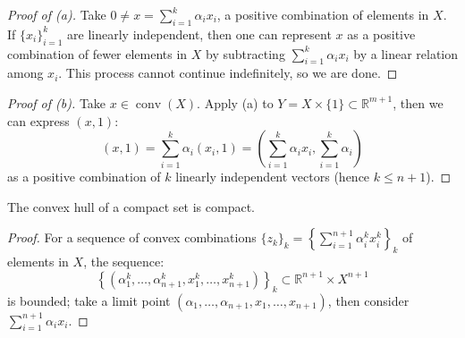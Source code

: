 \begin{proof}[Proof of (a)]
	Take $0\neq x=\sum_{i=1}^k\alpha_ix_i$, a positive combination of elements in $X$. If $\{x_i\}_{i=1}^k$ are linearly independent, then one can represent $x$ as a positive combination of fewer elements in $X$ by subtracting $\sum_{i=1}^k \alpha_ix_i$ by a linear relation among $x_i$. This process cannot continue indefinitely, so we are done.
\end{proof}

\begin{proof}[Proof of (b)]
	Take $x\in \operatorname{conv}(X)$. Apply (a) to $Y=X\times\{1\}\subset \mathbb{R}^{m+1}$, then we can express $(x,1)$:
	\[
		(x,1) = \sum_{i=1}^k \alpha_i (x_i,1)= \left(\sum_{i=1}^k \alpha_i x_i, \sum_{i=1}^k\alpha_i \right)
	\]
	as a positive combination of $k$ linearly independent vectors (hence $k\leq n + 1$).
\end{proof}

\begin{coro}\label{coro:011-cara-conv}
	The convex hull of a compact set is compact.
\end{coro}

\begin{proof}
	For a sequence of convex combinations $\{z_k\}_k=\left\{\sum_{i=1}^{n+1}\alpha_i^kx_i^k\right\}_k$ of elements in $X$, the sequence:
	\[\left\{(\alpha_1^k,\dotsc,\alpha_{n+1}^k,x_1^k,\dotsc,x_{n+1}^k)\right\}_k\subset \mathbb{R}^{n+1}\times X^{n+1}\]
	is bounded; take a limit point $(\alpha_1,\dotsc,\alpha_{n+1},x_1,\dotsc,x_{n+1})$, then consider $\sum_{i=1}^{n+1} \alpha_ix_i$.
\end{proof}

